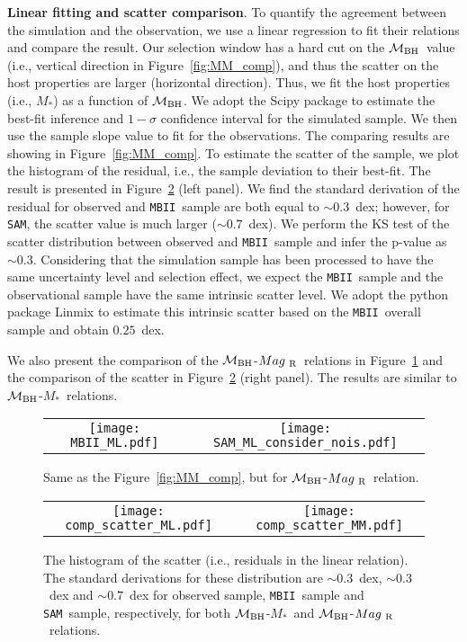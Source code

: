 \documentclass{natureprintstyle}
\newcommand{\mbh}{$\mathcal M_{\rm BH}$}
\newcommand{\mr}{$Mag_{\rm ~R}$}
\newcommand{\mstar}{{$M_*$}}
\newcommand{\sam}{\texttt{SAM}}
\newcommand{\mbii}{\texttt{MBII}}
\begin{document}
\textbf{Linear fitting and scatter comparison}.  
To quantify the agreement between the simulation and the observation, we use a linear regression to fit their relations and compare the result. Our selection window has a hard cut on the \mbh\ value (i.e., vertical direction in Figure~\ref{fig:MM_comp}), and thus the scatter on the host properties are larger (horizontal direction). Thus, we fit the host properties (i.e., \mstar) as a function of \mbh. We adopt the {\sc Scipy} package to estimate the best-fit inference and $1-\sigma$ confidence interval for the simulated sample. We then use the sample slope value to fit for the observations. The comparing results are showing in Figure~\ref{fig:MM_comp}. To estimate the scatter of the sample, we plot the histogram of the residual, i.e., the sample deviation to their best-fit. The result is presented in Figure~\ref{fig:offset_comp} (left panel). We find the standard derivation of the residual for observed and \mbii\ sample are both equal to $\sim0.3$~dex; however, for \sam, the scatter value is much larger ($\sim0.7$~dex).  We perform the KS test of the scatter distribution between observed and \mbii\ sample and infer the p-value as $\sim0.3$. Considering that the simulation sample has been processed to have the same uncertainty level and selection effect, we expect the \mbii\ sample and the observational sample have the same intrinsic scatter level. We adopt the python package {\sc Linmix} to estimate this intrinsic scatter based on the \mbii\ overall sample and obtain $0.25$~dex.

We also present the comparison of the \mbh-\mr\ relations in Figure~\ref{fig:ML_comp} and the comparison of the scatter in Figure~\ref{fig:offset_comp} (right panel). The results are similar to \mbh-\mstar\ relations.

\begin{figure*}[t]%
\begin{tabular}{c c}
\texttt{[image: MBII\_ML.pdf]} &
\texttt{[image: SAM\_ML\_consider\_nois.pdf]} \\
\end{tabular}
\caption{Same as the Figure~\ref{fig:MM_comp}, but for \mbh-\mr\ relation.}
\label{fig:ML_comp}
\end{figure*}


\begin{figure*}[t]%
\begin{tabular}{c c}
\texttt{[image: comp\_scatter\_ML.pdf]} &
\texttt{[image: comp\_scatter\_MM.pdf]} \\
\end{tabular}
\caption{The histogram of the scatter (i.e., residuals in the linear relation). The standard derivations for these distribution are $\sim0.3$~dex, $\sim0.3$~dex and $\sim0.7$~dex for observed sample, \mbii\ sample and \sam\ sample, respectively, for both \mbh-\mstar\ and \mbh-\mr\ relations.
}
\label{fig:offset_comp}
\end{figure*}
\end{document}
